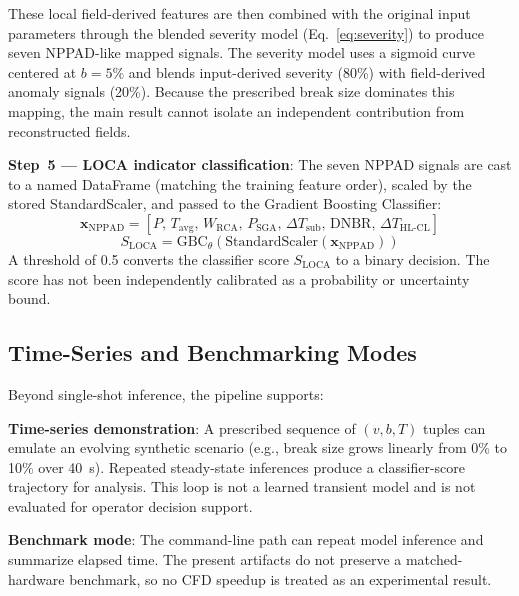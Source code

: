 \documentclass[journal]{IEEEtran}
\newcommand{\added}[1]{#1}
\begin{document}
\added{These local field-derived features are then combined with the original input parameters through the blended severity model (Eq.~\ref{eq:severity}) to produce seven NPPAD-like mapped signals. The severity model uses a sigmoid curve centered at $b = 5\%$ and blends input-derived severity (80\%) with field-derived anomaly signals (20\%). Because the prescribed break size dominates this mapping, the main result cannot isolate an independent contribution from reconstructed fields.}

\textbf{Step~5 --- LOCA indicator classification}: The seven NPPAD signals are cast to a named DataFrame (matching the training feature order), scaled by the stored StandardScaler, and passed to the Gradient Boosting Classifier:
\begin{equation}
\bm{x}_{\text{NPPAD}} =
\left[
P,\,
T_{\text{avg}},\,
W_{\text{RCA}},\,
P_{\text{SGA}},\,
\Delta T_{\text{sub}},\,
\mathrm{DNBR},\,
\Delta T_{\text{HL-CL}}
\right]
\end{equation}
\begin{equation}
S_{\mathrm{LOCA}} =
\mathrm{GBC}_{\theta}\!\left(
\mathrm{StandardScaler}\!\left(\bm{x}_{\text{NPPAD}}\right)
\right)
\end{equation}
 \added{A threshold of 0.5 converts the classifier score $S_{\mathrm{LOCA}}$ to a binary decision. The score has not been independently calibrated as a probability or uncertainty bound.}

\subsection{Time-Series and Benchmarking Modes}

Beyond single-shot inference, the pipeline supports:

\textbf{Time-series demonstration}: A prescribed sequence of $(v,b,T)$ tuples can emulate an evolving synthetic scenario (e.g., break size grows linearly from 0\% to 10\% over 40~s). Repeated steady-state inferences produce a classifier-score trajectory for analysis. \added{This loop is not a learned transient model and is not evaluated for operator decision support.}

\textbf{Benchmark mode}: \added{The command-line path can repeat model inference and summarize elapsed time. The present artifacts do not preserve a matched-hardware benchmark, so no CFD speedup is treated as an experimental result.}

\end{document}
